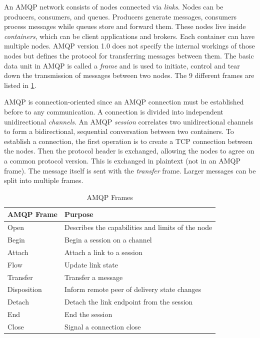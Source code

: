 An AMQP network consists of nodes connected via \textit{links}. Nodes can be
producers, consumers, and queues. Producers generate messages, consumers process
messages while queues store and forward them. These nodes live inside
\textit{containers}, which can be client applications and brokers. Each
container can have multiple nodes. AMQP version 1.0 does not specify the
internal workings of those nodes but defines the protocol for transferring
messages between them. The basic data unit in AMQP is called a \textit{frame}
and is used to initiate, control and tear down the transmission of messages
between two nodes. The 9 different frames are listed in
\cref{table-amqp-frames}.

AMQP is connection-oriented since an AMQP connection must be established before
to any communication. A connection is divided into independent unidirectional
\textit{channels}. An AMQP \textit{session} correlates two unidirectional
channels to form a bidirectional, sequential conversation between two
containers. To establish a connection, the first operation is to create a TCP
connection between the nodes. Then the protocol header is exchanged, allowing
the nodes to agree on a common protocol version. This is exchanged in plaintext
(not in an AMQP frame). The message itself is sent with the \textit{transfer}
frame. Larger messages can be split into multiple frames.


\begin{table}[h]
\begin{tabularx}{\textwidth}{| X | X |}
\hline
  \textbf{AMQP Frame} & \textbf{Purpose} \\ \hline
  Open & Describes the capabilities and limits of the node \\ \hline
  Begin & Begin a session on a channel \\ \hline
  Attach & Attach a link to a session \\ \hline
  Flow & Update link state \\ \hline
  Transfer & Transfer a message \\ \hline
  Disposition & Inform remote peer of delivery state changes \\ \hline
  Detach & Detach the link endpoint from the session \\ \hline
  End & End the session\\ \hline
  Close & Signal a connection close\\ \hline
\end{tabularx}
\caption{AMQP Frames}
\label{table-amqp-frames}
\end{table}

